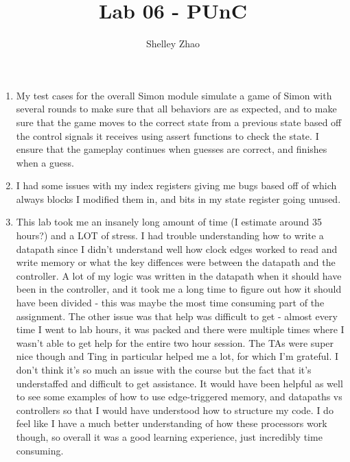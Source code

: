 \documentclass[11pt]{article}
\begin{document}
\author{Shelley Zhao}
\title{Lab 06 - PUnC}
\date{\vspace{-5ex}}
\maketitle

\begin{enumerate}
	\item My test cases for the overall Simon module simulate a game of Simon with several rounds to make sure that all behaviors are as expected, and to make sure that the game moves to the correct state from a previous state based off the control signals it receives using assert functions to check the state. I ensure that the gameplay continues when guesses are correct, and finishes when a guess.
	\item I had some issues with my index registers giving me bugs based off of which always blocks I modified them in, and bits in my state register going unused.
	\item This lab took me an insanely long amount of time (I estimate around 35 hours?)  and a LOT of stress. I had trouble understanding how to write a datapath since I didn't understand well how clock edges worked to read and write memory or what the key diffences were between the datapath and the controller. A lot of my logic was written in the datapath when it should have been in the controller, and it took me a long time to figure out how it should have been divided - this was maybe the most time consuming part of the assignment. The other issue was that help was difficult to get - almost every time I went to lab hours, it was packed and there were multiple times where I wasn't able to get help for the entire two hour session. The TAs were super nice though and Ting in particular helped me a lot, for which I'm grateful. I don't think it's so much an issue with the course but the fact that it's understaffed and difficult to get assistance. It would have been helpful as well to see some examples of how to use edge-triggered memory, and datapaths vs controllers so that I would have understood how to structure my code. I do feel like I have a much better understanding of how these processors work though, so overall it was a good learning experience, just incredibly time consuming. 
	
\end{enumerate}
	
\end{document}
